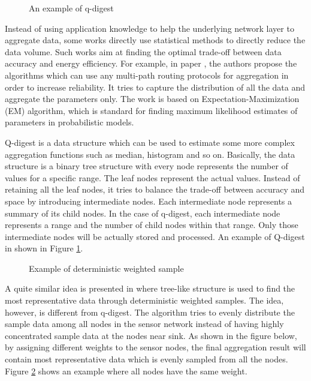 \begin{figure}
\centering
{}
\caption{An example of q-digest}
\label{fig:qdigest}
\end{figure}

Instead of using application knowledge to help the underlying network layer to aggregate data, some works directly use statistical methods to directly reduce the data volume. Such works aim at finding the optimal trade-off between data accuracy and energy efficiency. For example, in paper \cite{jiang:statistical}, the authors propose the algorithms which can use any multi-path routing protocols for aggregation in order to increase reliability. It tries to capture the distribution of all the data and aggregate the parameters only. The work is based on Expectation-Maximization (EM) algorithm, which is standard for finding maximum likelihood estimates of parameters in probabilistic models.

Q-digest \cite{qdigest} is a data structure which can be used to estimate some more complex aggregation functions such as median, histogram and so on. Basically, the data structure is a binary tree structure with every node represents the number of values for a specific range. The leaf nodes represent the actual values. Instead of retaining all the leaf nodes, it tries to balance the trade-off between accuracy and space by introducing intermediate nodes. Each intermediate node represents a summary of its child nodes. In the case of q-digest, each intermediate node represents a range and the number of child nodes within that range. Only those intermediate nodes will be actually stored and processed. An example of Q-digest in shown in Figure \ref{fig:qdigest}.

\begin{figure}
\centering
{}
\caption{Example of deterministic weighted sample}
\label{fig:deterministic}
\end{figure}

A quite similar idea is presented in \cite{akca:deterministic} where tree-like structure is used to find the most representative data through deterministic weighted samples. The idea, however, is different from q-digest. The algorithm tries to evenly distribute the sample data among all nodes in the sensor network instead of having highly concentrated sample data at the nodes near sink. As shown in the figure below, by assigning different weights to the sensor nodes, the final aggregation result will contain most representative data which is evenly sampled from all the nodes. Figure \ref{fig:deterministic} shows an example where all nodes have the same weight.

